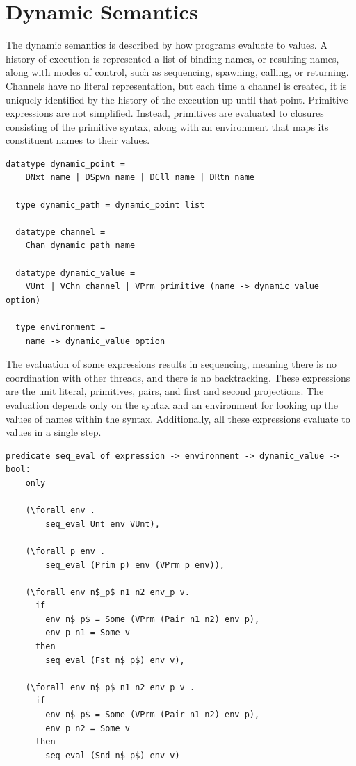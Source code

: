 \documentclass[10pt]{article}
\begin{document}
\section{Dynamic Semantics}
The dynamic semantics is described by how programs evaluate to values.
A history of execution is
represented a list of binding names, or resulting names, along with modes of control, such as
sequencing, spawning, calling, or returning. Channels have no literal representation, but each
time a channel is created, it is uniquely identified by the history of the execution up until
that point. Primitive expressions are not simplified.  Instead, primitives are evaluated to
closures consisting of the primitive syntax, along with an environment that maps its
constituent names to their values.

\begin{lstlisting}[language=logic]
  datatype dynamic_point =
    DNxt name | DSpwn name | DCll name | DRtn name 

  type dynamic_path = dynamic_point list

  datatype channel =
    Chan dynamic_path name 

  datatype dynamic_value = 
    VUnt | VChn channel | VPrm primitive (name -> dynamic_value option)

  type environment =
    name -> dynamic_value option
  \end{lstlisting}

The evaluation of some expressions results in sequencing, meaning there is no coordination
with other threads, and there is no backtracking. These expressions are the
unit literal, primitives, pairs, and first and second projections. The evaluation depends only
on the syntax and an environment for looking up the values of names within the syntax.
Additionally, all these expressions evaluate to values in a single step.

\begin{lstlisting}[language=logic, mathescape]
  predicate seq_eval of expression -> environment -> dynamic_value -> bool:
    only

    (\forall env . 
        seq_eval Unt env VUnt),
        
    (\forall p env .
        seq_eval (Prim p) env (VPrm p env)),

    (\forall env n$_p$ n1 n2 env_p v. 
      if
        env n$_p$ = Some (VPrm (Pair n1 n2) env_p),
        env_p n1 = Some v
      then
        seq_eval (Fst n$_p$) env v),

    (\forall env n$_p$ n1 n2 env_p v . 
      if
        env n$_p$ = Some (VPrm (Pair n1 n2) env_p), 
        env_p n2 = Some v 
      then
        seq_eval (Snd n$_p$) env v)
  \end{lstlisting}
\end{document}
